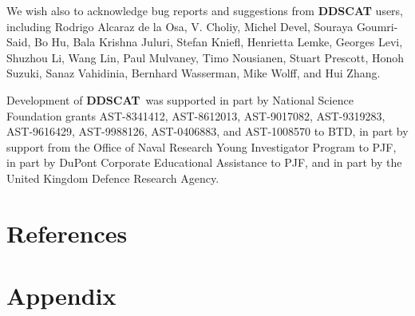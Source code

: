 We wish also to acknowledge bug reports and suggestions from {{\bf DDSCAT}}
users, including
Rodrigo Alcaraz de la Osa, 
V. Choliy,
Michel Devel,
Souraya Goumri-Said,
Bo Hu,
Bala Krishna Juluri,
Stefan Kniefl,
Henrietta Lemke, 
Georges Levi, 
Shuzhou Li,
Wang Lin,
Paul Mulvaney, 
Timo Nousianen, 
Stuart Prescott,
Honoh Suzuki, 
Sanaz Vahidinia,
Bernhard Wasserman,
Mike Wolff,
and Hui Zhang.

Development of {{\bf DDSCAT}}\ was supported in part by 
National Science Foundation
grants AST-8341412, AST-8612013, AST-9017082, AST-9319283, 
AST-9616429, AST-9988126, AST-0406883, and AST-1008570 to BTD,
in part by support from the Office of Naval Research 
Young Investigator Program to PJF, in part by DuPont Corporate Educational
Assistance to PJF, and in part by the United Kingdom Defence Research Agency.
\section{References}

\newpage

\section{Appendix}


